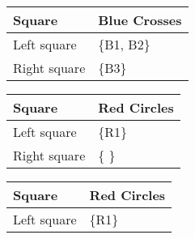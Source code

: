 \documentclass[letterpaper,10pt,english]{sphinxmanual}
\begin{document}
\begin{savenotes}\sphinxattablestart
\centering
{}
\label{\detokenize{concept:id43}}\label{\detokenize{concept:tableiiia}}
\sphinxaftercaption
\begin{tabulary}{\linewidth}[t]{|T|T|}
\hline
\sphinxstyletheadfamily 
Square
&\sphinxstyletheadfamily 
Blue Crosses
\\
\hline
Left square
&
\{B1, B2\}
\\
\hline
Right square
&
\{B3\}
\\
\hline
\end{tabulary}
\par
\sphinxattableend\end{savenotes}


\begin{savenotes}\sphinxattablestart
\centering
{}
\label{\detokenize{concept:id44}}\label{\detokenize{concept:tableiiib}}
\sphinxaftercaption
\begin{tabulary}{\linewidth}[t]{|T|T|}
\hline
\sphinxstyletheadfamily 
Square
&\sphinxstyletheadfamily 
Red Circles
\\
\hline
Left square
&
\{R1\}
\\
\hline
Right square
&
\{  \}
\\
\hline
\end{tabulary}
\par
\sphinxattableend\end{savenotes}


\begin{savenotes}\sphinxattablestart
\centering
{}
\label{\detokenize{concept:id45}}\label{\detokenize{concept:tableiiic}}
\sphinxaftercaption
\begin{tabulary}{\linewidth}[t]{|T|T|}
\hline
\sphinxstyletheadfamily 
Square
&\sphinxstyletheadfamily 
Red Circles
\\
\hline
Left square
&
\{R1\}
\\
\hline
\end{tabulary}
\par
\sphinxattableend\end{savenotes}
\end{document}
